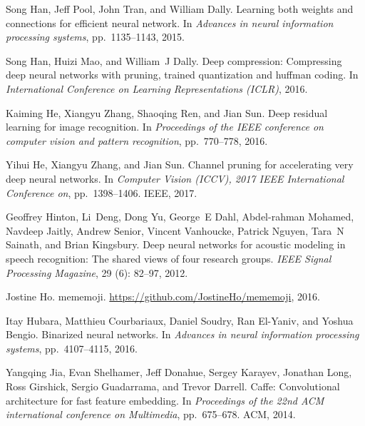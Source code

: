 \documentclass{article} %
\begin{document}
\begin{thebibliography}{36}
Song Han, Jeff Pool, John Tran, and William Dally.
\newblock Learning both weights and connections for efficient neural network.
\newblock In \emph{Advances in neural information processing systems}, pp.\  1135--1143, 2015.

Song Han, Huizi Mao, and William~J Dally.
\newblock Deep compression: Compressing deep neural networks with pruning,
  trained quantization and huffman coding.
\newblock In \emph{International Conference on Learning Representations
  (ICLR)}, 2016.

Kaiming He, Xiangyu Zhang, Shaoqing Ren, and Jian Sun.
\newblock Deep residual learning for image recognition.
\newblock In \emph{Proceedings of the IEEE conference on computer vision and
  pattern recognition}, pp.\ 770--778, 2016.

Yihui He, Xiangyu Zhang, and Jian Sun.
\newblock Channel pruning for accelerating very deep neural networks.
\newblock In \emph{Computer Vision (ICCV), 2017 IEEE International Conference
  on}, pp.\ 1398--1406. IEEE, 2017.

Geoffrey Hinton, Li~Deng, Dong Yu, George~E Dahl, Abdel-rahman Mohamed, Navdeep
  Jaitly, Andrew Senior, Vincent Vanhoucke, Patrick Nguyen, Tara~N Sainath, and
  Brian Kingsbury.
\newblock Deep neural networks for acoustic modeling in speech recognition: The
  shared views of four research groups.
\newblock \emph{IEEE Signal Processing Magazine}, 29 (6):
  82--97, 2012.

Jostine Ho.
\newblock mememoji.
\newblock \url{https://github.com/JostineHo/mememoji}, 2016.

Itay Hubara, Matthieu Courbariaux, Daniel Soudry, Ran El-Yaniv, and Yoshua
  Bengio.
\newblock Binarized neural networks.
\newblock In \emph{Advances in neural information processing systems}, pp.\  4107--4115, 2016.

Yangqing Jia, Evan Shelhamer, Jeff Donahue, Sergey Karayev, Jonathan Long, Ross
  Girshick, Sergio Guadarrama, and Trevor Darrell.
\newblock Caffe: Convolutional architecture for fast feature embedding.
\newblock In \emph{Proceedings of the 22nd ACM international conference on
  Multimedia}, pp.\ 675--678. ACM, 2014.


\end{thebibliography}
\end{document}
